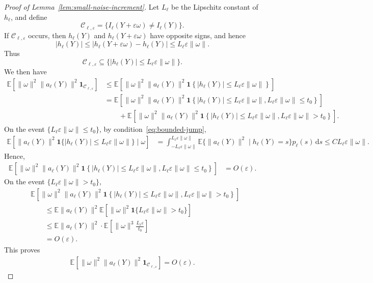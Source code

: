 \documentclass[12pt]{article}
\newcommand{\rd}{{\mathrm{d}}}
\newcommand{\EE}[2][]{\mathbb{E}_{#1}\left[#2\right]}
\newcommand{\ep}{\varepsilon}
\newcommand{\Indc}[1]{{\mathbf{1}\left\{{#1}\right\}}}
\theoremstyle{general}
\begin{document}
\begin{proof}[Proof of Lemma~\ref{lem:small-noise-increment}]
Let \(L_\ell\) be the Lipschitz constant of \(h_\ell\), and define
\[
\mathcal C_{\ell,\ep}
=
\{I_\ell(Y+\ep\omega)\neq I_\ell(Y)\}.
\]
If \(\mathcal C_{\ell,\ep}\) occurs, then $h_\ell(Y)$ and $h_\ell(Y+\ep\omega)$ have opposite signs, and hence
\[
|h_\ell(Y)|
\leq
|h_\ell(Y+\ep\omega)-h_\ell(Y)|
\leq
L_\ell\ep\|\omega\|.
\]
Thus
\[
\mathcal C_{\ell,\ep}
\subseteq
\{|h_\ell(Y)|\leq L_\ell\ep\|\omega\|\}.
\]
We then have
\begin{align*}
\mathbb E\left[
\|\omega\|^2
\|a_\ell(Y)\|^2
\mathbf 1_{\mathcal C_{\ell,\ep}}
\right] &\leq \EE{\|\omega\|^2 \|a_\ell(Y)\|^2 \Indc{|h_\ell(Y)|\leq L_\ell \ep \|\omega\| } }\\
&=  \EE{\|\omega\|^2 \|a_\ell(Y)\|^2 \Indc{|h_\ell(Y)|\leq L_\ell \ep \|\omega\|, L_\ell \ep \|\omega\|\leq t_0 } }\\
&\qquad + \EE{\|\omega\|^2 \|a_\ell(Y)\|^2 \Indc{|h_\ell(Y)|\leq L_\ell \ep \|\omega\|, L_\ell \ep \|\omega\|> t_0 } }.
\end{align*}
On the event \(\{L_\ell\ep\|\omega\|\leq t_0\}\), 
by condition~\eqref{eq:bounded-jump}, 
\begin{align*}
\mathbb E\left[
\|a_\ell(Y)\|^2
\mathbf 1\{|h_\ell(Y)|\leq L_\ell \ep \|\omega\| \}
\mid \omega
\right]
&=
\int_{-L_\ell \ep \|\omega\|}^{L_\ell \ep \|\omega\|}
\mathbb E\{\|a_\ell(Y)\|^2\mid h_\ell(Y)=s\}
p_\ell(s)\,\rd s  \leq C L_\ell \ep \|\omega\|.
\end{align*}
Hence,
\begin{align*}
    \EE{\|\omega\|^2 \|a_\ell(Y)\|^2 \Indc{|h_\ell(Y)|\leq L_\ell \ep \|\omega\|, L_\ell \ep \|\omega\|\leq t_0 } } &= O(\ep).
\end{align*}
On the event \( \{L_\ell\ep\|\omega\|> t_0\} \),
\begin{align*}
&\EE{\|\omega\|^2 \|a_\ell(Y)\|^2 \Indc{|h_\ell(Y)|\leq L_\ell \ep \|\omega\|, L_\ell \ep \|\omega\|> t_0 } }\\
&\qquad \leq\mathbb E\|a_\ell(Y)\|^2
\mathbb E\left[
\|\omega\|^2
\mathbf 1\{L_\ell\ep\|\omega\|>t_0\}
\right] \\
&\qquad \leq \mathbb E\|a_\ell(Y)\|^2 \cdot \EE{\|\omega\|^3 \frac{L_\ell \ep}{t_0} } \\
&\qquad=O(\ep).
\end{align*}
This proves 
\begin{align*}
    \EE{\|\omega\|^2 \|a_\ell(Y)\|^2 \mathbf 1_{\mathcal C_{\ell,\ep}}} = O(\ep).
\end{align*}
\end{proof}
\end{document}
